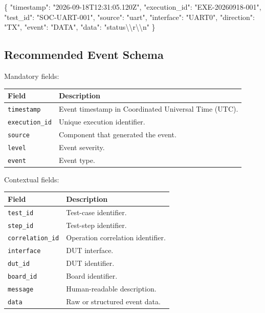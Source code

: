 \documentclass[
  11pt,
  letterpaper,
  DIV=11,
  numbers=noendperiod]{scrartcl}
\newenvironment{Shaded}{}{}
\newcommand{\CharTok}[1]{\textcolor[rgb]{0.01,0.18,0.38}{#1}}
\newcommand{\DataTypeTok}[1]{\textcolor[rgb]{0.84,0.23,0.29}{#1}}
\newcommand{\FunctionTok}[1]{\textcolor[rgb]{0.44,0.26,0.76}{#1}}
\newcommand{\StringTok}[1]{\textcolor[rgb]{0.01,0.18,0.38}{#1}}
\newcounter{none} %
\begin{document}
\begin{Shaded}
\begin{Highlighting}[]
\FunctionTok{\{}
    \DataTypeTok{"timestamp"}\FunctionTok{:} \StringTok{"2026{-}09{-}18T12:31:05.120Z"}\FunctionTok{,}
    \DataTypeTok{"execution\_id"}\FunctionTok{:} \StringTok{"EXE{-}20260918{-}001"}\FunctionTok{,}
    \DataTypeTok{"test\_id"}\FunctionTok{:} \StringTok{"SOC{-}UART{-}001"}\FunctionTok{,}
    \DataTypeTok{"source"}\FunctionTok{:} \StringTok{"uart"}\FunctionTok{,}
    \DataTypeTok{"interface"}\FunctionTok{:} \StringTok{"UART0"}\FunctionTok{,}
    \DataTypeTok{"direction"}\FunctionTok{:} \StringTok{"TX"}\FunctionTok{,}
    \DataTypeTok{"event"}\FunctionTok{:} \StringTok{"DATA"}\FunctionTok{,}
    \DataTypeTok{"data"}\FunctionTok{:} \StringTok{"status}\CharTok{\textbackslash{}\textbackslash{}}\StringTok{r}\CharTok{\textbackslash{}\textbackslash{}}\StringTok{n"}
\FunctionTok{\}}
\end{Highlighting}
\end{Shaded}

\subsection{Recommended Event Schema}\label{recommended-event-schema}

Mandatory fields:

{\def\LTcaptype{none} %
\begin{longtable}[]{@{}ll@{}}
\toprule\noalign{}
Field & Description \\
\midrule\noalign{}
\endhead
\bottomrule\noalign{}
\endlastfoot
\texttt{timestamp} & Event timestamp in Coordinated Universal Time
(UTC). \\
\texttt{execution\_id} & Unique execution identifier. \\
\texttt{source} & Component that generated the event. \\
\texttt{level} & Event severity. \\
\texttt{event} & Event type. \\
\end{longtable}
}

Contextual fields:

{\def\LTcaptype{none} %
\begin{longtable}[]{@{}ll@{}}
\toprule\noalign{}
Field & Description \\
\midrule\noalign{}
\endhead
\bottomrule\noalign{}
\endlastfoot
\texttt{test\_id} & Test-case identifier. \\
\texttt{step\_id} & Test-step identifier. \\
\texttt{correlation\_id} & Operation correlation identifier. \\
\texttt{interface} & DUT interface. \\
\texttt{dut\_id} & DUT identifier. \\
\texttt{board\_id} & Board identifier. \\
\texttt{message} & Human-readable description. \\
\texttt{data} & Raw or structured event data. \\
\end{longtable}
}
\end{document}
